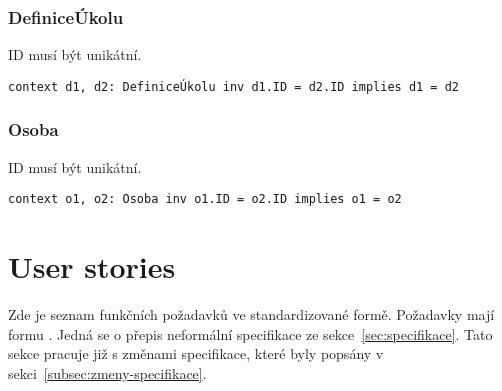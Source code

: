 \subsubsection{DefiniceÚkolu}

ID musí být unikátní.

\begin{verbatim}
context d1, d2: DefiniceÚkolu inv d1.ID = d2.ID implies d1 = d2
\end{verbatim}

\subsubsection{Osoba}

ID musí být unikátní.

\begin{verbatim}
context o1, o2: Osoba inv o1.ID = o2.ID implies o1 = o2
\end{verbatim}

\section{User stories}\label{sec:user-stories}

Zde je seznam funkčních požadavků ve standardizované formě.
Požadavky mají formu .
Jedná se o přepis neformální specifikace ze sekce~\ref{sec:specifikace}.
Tato sekce pracuje již s změnami specifikace, které byly popsány v sekci~\ref{subsec:zmeny-specifikace}.

